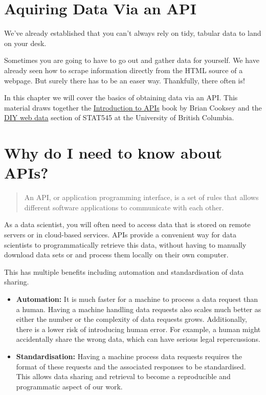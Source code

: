 \documentclass[
  letterpaper,
  DIV=11,
  numbers=noendperiod]{scrreprt}
\begin{document}
\section{Aquiring Data Via an API}\label{aquiring-data-via-an-api}

We've already established that you can't always rely on tidy, tabular
data to land on your desk.

Sometimes you are going to have to go out and gather data for yourself.
We have already seen how to scrape information directly from the HTML
source of a webpage. But surely there has to be an easer way.
Thankfully, there often is!

In this chapter we will cover the basics of obtaining data via an API.
This material draws together the
\href{https://zapier.com/learn/apis/}{Introduction to APIs} book by
Brian Cooksey and the
\href{https://stat545.com/diy-web-data.html\#interacting-with-an-api}{DIY
web data} section of STAT545 at the University of British Columbia.

\section{Why do I need to know about
APIs?}\label{why-do-i-need-to-know-about-apis}

\begin{quote}
An API, or application programming interface, is a set of rules that
allows different software applications to communicate with each other.
\end{quote}

As a data scientist, you will often need to access data that is stored
on remote servers or in cloud-based services. APIs provide a convenient
way for data scientists to programmatically retrieve this data, without
having to manually download data sets or and process them locally on
their own computer.

This has multiple benefits including automation and standardisation of
data sharing.

\begin{itemize}
\item
  \textbf{Automation:} It is much faster for a machine to process a data
  request than a human. Having a machine handling data requests also
  scales much better as either the number or the complexity of data
  requests grows. Additionally, there is a lower risk of introducing
  human error. For example, a human might accidentally share the wrong
  data, which can have serious legal repercussions.
\item
  \textbf{Standardisation:} Having a machine process data requests
  requires the format of these requests and the associated responses to
  be standardised. This allows data sharing and retrieval to become a
  reproducible and programmatic aspect of our work.
\end{itemize}
\end{document}
